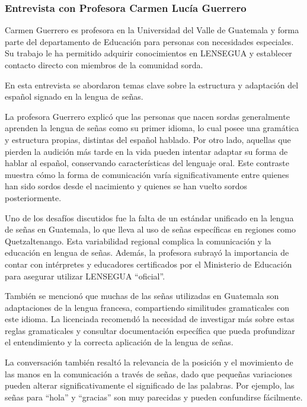 \subsubsection{Entrevista con Profesora Carmen Lucía Guerrero}

Carmen Guerrero es profesora en la Universidad del Valle de Guatemala y forma parte del departamento de Educación para personas con necesidades especiales. Su trabajo le ha permitido adquirir conocimientos en LENSEGUA y establecer contacto directo con miembros de la comunidad sorda.

En esta entrevista se abordaron temas clave sobre la estructura y adaptación del español signado en la lengua de señas. 

La profesora Guerrero explicó que las personas que nacen sordas generalmente aprenden la lengua de señas como su primer idioma, lo cual posee una gramática y estructura propias, distintas del español hablado. Por otro lado, aquellas que pierden la audición más tarde en la vida pueden intentar adaptar su forma de hablar al español, conservando características del lenguaje oral. Este contraste muestra cómo la forma de comunicación varía significativamente entre quienes han sido sordos desde el nacimiento y quienes se han vuelto sordos posteriormente.

Uno de los desafíos discutidos fue la falta de un estándar unificado en la lengua de señas en Guatemala, lo que lleva al uso de señas específicas en regiones como Quetzaltenango. Esta variabilidad regional complica la comunicación y la educación en lengua de señas. Además, la profesora subrayó la importancia de contar con intérpretes y educadores certificados por el Ministerio de Educación para asegurar utilizar LENSEGUA “oficial”. 

También se mencionó que muchas de las señas utilizadas en Guatemala son adaptaciones de la lengua francesa, compartiendo similitudes gramaticales con este idioma. La licenciada recomendó la necesidad de investigar más sobre estas reglas gramaticales y consultar documentación específica que pueda profundizar el entendimiento y la correcta aplicación de la lengua de señas.

La conversación también resaltó la relevancia de la posición y el movimiento de las manos en la comunicación a través de señas, dado que pequeñas variaciones pueden alterar significativamente el significado de las palabras. Por ejemplo, las señas para ``hola'' y ``gracias'' son muy parecidas y pueden confundirse fácilmente. 

